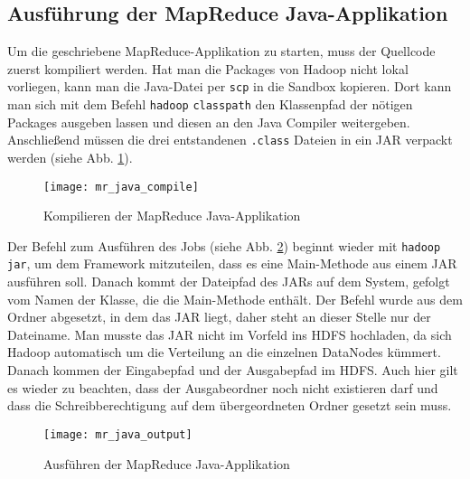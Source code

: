 

\subsection{Ausführung der MapReduce Java-Applikation}
Um die geschriebene MapReduce-Applikation zu starten, muss der Quellcode zuerst kompiliert werden. Hat man die Packages von Hadoop nicht lokal vorliegen, kann man die Java-Datei per \verb|scp| in die Sandbox kopieren. Dort kann man sich mit dem Befehl \verb|hadoop| \verb|classpath| den Klassenpfad der nötigen Packages ausgeben lassen und diesen an den Java Compiler weitergeben. Anschließend müssen die drei entstandenen \verb|.class| Dateien in ein JAR verpackt werden (siehe Abb. \ref{fig:mr java api compile}). 

\begin{figure}[ht]
    \centering
    \texttt{[image: mr\_java\_compile]}
    \caption[Kompilieren der MapReduce Java-Applikation]{Kompilieren der MapReduce Java-Applikation}
    \label{fig:mr java api compile}
\end{figure}

Der Befehl zum Ausführen des Jobs (siehe Abb. \ref{fig:mr java api command}) beginnt wieder mit \verb|hadoop jar|, um dem Framework mitzuteilen, dass es eine Main-Methode aus einem JAR ausführen soll. Danach kommt der Dateipfad des JARs auf dem System, gefolgt vom Namen der Klasse, die die Main-Methode enthält. Der Befehl wurde aus dem Ordner abgesetzt, in dem das JAR liegt, daher steht an dieser Stelle nur der Dateiname. Man musste das JAR nicht im Vorfeld ins HDFS hochladen, da sich Hadoop automatisch um die Verteilung an die einzelnen DataNodes kümmert. Danach kommen der Eingabepfad und der Ausgabepfad im HDFS. Auch hier gilt es wieder zu beachten, dass der Ausgabeordner noch nicht existieren darf und dass die Schreibberechtigung auf dem übergeordneten Ordner gesetzt sein muss. 

\begin{figure}[ht]
    \centering
    \texttt{[image: mr\_java\_output]}
    \caption[Ausführen der MapReduce Java-Applikation]{Ausführen der MapReduce Java-Applikation}
    \label{fig:mr java api command}
\end{figure}

